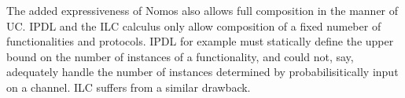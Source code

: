 The added expressiveness of Nomos also allows full composition in the manner of UC.
IPDL and the ILC calculus only allow composition of a fixed numeber of functionalities and protocols. 
IPDL for example must statically define the upper bound on the number of instances of a functionality, and could not, say, adequately handle the number of instances determined by probabilisitically input on a channel.
ILC suffers from a similar drawback.

%
%
%

